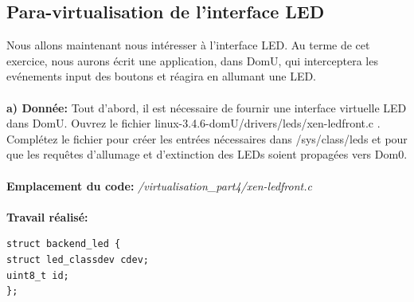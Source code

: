 \subsection{Para-virtualisation de l'interface LED}
Nous allons maintenant nous intéresser à l’interface LED. Au terme de cet exercice, nous aurons écrit
une application, dans DomU, qui interceptera les evénements input des boutons et réagira en allumant
une LED.\\\\
\textbf{a) Donnée: }Tout d’abord, il est nécessaire de fournir une interface virtuelle LED dans DomU. Ouvrez le
fichier linux-3.4.6-domU/drivers/leds/xen-ledfront.c . Complétez le fichier pour créer les entrées
nécessaires dans /sys/class/leds et pour que les requêtes d’allumage et d’extinction des LEDs
soient propagées vers Dom0.\\\\
\textbf{Emplacement du code: }\textit{/virtualisation\_part4/xen-ledfront.c}\\\\
\textbf{Travail réalisé: }
\begin{lstlisting}
struct backend_led {
struct led_classdev cdev;
uint8_t id;
};
\end{lstlisting}

